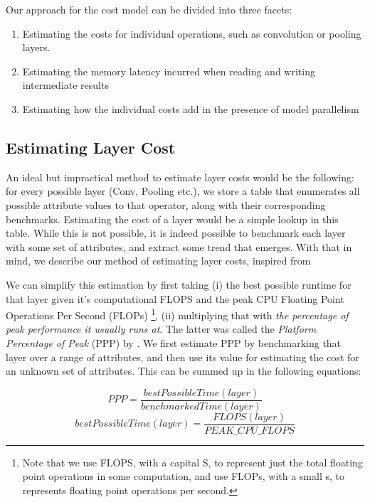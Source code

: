 \documentclass[12pt,a4paper,twoside,openright,bibliography=totocnumbered]{report}
\begin{document}
    Our approach for the cost model can be divided into three facets: 
    \begin{enumerate}
        \item Estimating the costs for individual operations, such as convolution or pooling layers.
        \item Estimating the memory latency incurred when reading and writing intermediate results
        \item Estimating how the individual costs add in the presence of model parallelism
    \end{enumerate}

    \subsection{Estimating Layer Cost}
    An ideal but impractical method to estimate layer costs would be the following: for every possible layer (Conv, Pooling etc.), we store a table that enumerates all possible attribute values to that operator, along with their corresponding benchmarks. Estimating the cost of a layer would be a simple lookup in this table. While this is not possible, it is indeed possible to benchmark each layer with some set of attributes, and extract some trend that emerges. With that in mind, we describe our method of estimating layer costs, inspired from \cite{qi2017paleo}

    We can simplify this estimation by first taking (i) the best possible runtime for that layer given it's computational FLOPS and the peak CPU Floating Point Operations Per Second (FLOPs) \footnote{Note that we use FLOPS, with a capital S, to represent just the total floating point operations in some computation, and use FLOPs, with a small s, to represents floating point operations per second. }, (ii) multiplying that with \textit{the percentage of peak performance it usually runs at}. The latter was called the \textit{Platform Percentage of Peak} (PPP) by \cite{qi2017paleo}. We first estimate PPP by benchmarking that layer over a range of attributes, and then use its value for estimating the cost for an unknown set of attributes. This can be summed up in the following equations:

    \begin{equation}
        PPP = \frac{bestPossibleTime(layer)}{benchmarkedTime(layer)}
        \label{ppp}
    \end{equation}
    \begin{equation}
        bestPossibleTime(layer) = \frac{FLOPS(layer)}{PEAK\_CPU\_FLOPS}
        \label{optTime}
    \end{equation}
\end{document}
